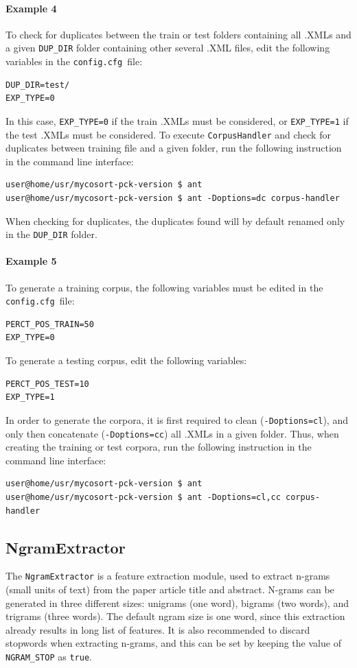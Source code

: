 \documentclass[11pt]{article}
\newcommand{\configfile}{\texttt{config.cfg{ }}}
\begin{document}
\paragraph{Example 4}
To check for duplicates between the train or test folders containing all .XMLs and 
a given \texttt{DUP\_DIR} folder containing other several .XML files, 
edit the following variables in the \configfile file:
\begin{lstlisting}
DUP_DIR=test/
EXP_TYPE=0
\end{lstlisting}
In this case, \texttt{EXP\_TYPE=0} if the train .XMLs must be considered, 
or \texttt{EXP\_TYPE=1} if the test .XMLs must be considered.
To execute \texttt{CorpusHandler} and check for duplicates between training file and a given folder,
run the following instruction in the command line interface:
\begin{lstlisting}
user@home/usr/mycosort-pck-version $ ant
user@home/usr/mycosort-pck-version $ ant -Doptions=dc corpus-handler
\end{lstlisting}
When checking for duplicates, the duplicates found will by default renamed only in the \texttt{DUP\_DIR} folder. \\

\paragraph{Example 5}
To generate a training corpus, the following variables must be edited in the \configfile file:
\begin{lstlisting}
PERCT_POS_TRAIN=50
EXP_TYPE=0
\end{lstlisting}
To generate a testing corpus, edit the following variables:
\begin{lstlisting}
PERCT_POS_TEST=10
EXP_TYPE=1
\end{lstlisting}
In order to generate the corpora, it is first required to clean (\texttt{-Doptions=cl}), 
and only then concatenate (\texttt{-Doptions=cc}) all .XMLs in a given folder.
Thus, when creating the training or test corpora, 
run the following instruction in the command line interface:
\begin{lstlisting}
user@home/usr/mycosort-pck-version $ ant
user@home/usr/mycosort-pck-version $ ant -Doptions=cl,cc corpus-handler
\end{lstlisting}

\subsection{NgramExtractor}
The \texttt{NgramExtractor} is a feature extraction module, used to extract n-grams 
(small units of text) from the paper article title and abstract.
N-grams can be generated in three different sizes: unigrams (one word), bigrams (two words), and trigrams (three words).
The default ngram size is one word, since this extraction already results in long list of features.
It is also recommended to discard stopwords when extracting n-grams, 
and this can be set by keeping the value of \texttt{NGRAM\_STOP} as \texttt{true}.
\end{document}
